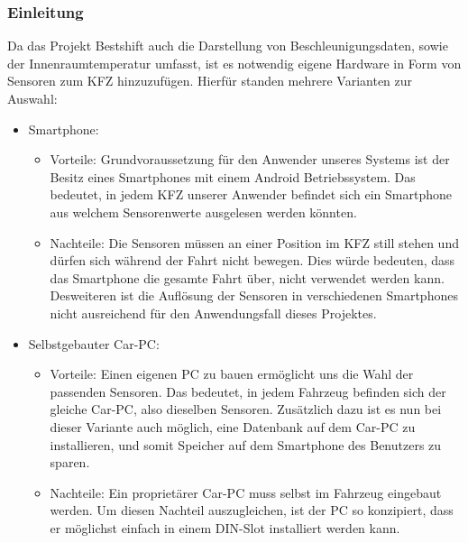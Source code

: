 \subsubsection{Einleitung}
\label{subsec:Einleitung}

Da das Projekt Bestshift auch die Darstellung von Beschleunigungsdaten, sowie der Innenraumtemperatur umfasst, ist es notwendig eigene Hardware in Form von Sensoren zum KFZ hinzuzufügen.
Hierfür standen mehrere Varianten zur Auswahl:

\begin{itemize}
	\item Smartphone:
	\begin{itemize}
	\item Vorteile: \nextline
	Grundvoraussetzung für den Anwender unseres Systems ist der Besitz eines Smartphones mit einem Android Betriebssystem.
	Das bedeutet, in jedem KFZ unserer Anwender befindet sich ein Smartphone aus welchem Sensorenwerte ausgelesen werden könnten.
	\item Nachteile: \nextline
	Die Sensoren müssen an einer Position im KFZ still stehen und dürfen sich während der Fahrt nicht bewegen. Dies würde bedeuten, dass das Smartphone die gesamte Fahrt über, nicht verwendet werden kann.
\nextline
Desweiteren ist die Auflösung der Sensoren in verschiedenen Smartphones nicht ausreichend für den Anwendungsfall dieses Projektes.
	\end{itemize}
	\item Selbstgebauter Car-PC:
	\begin{itemize}
	\item Vorteile: \nextline
	Einen eigenen PC zu bauen ermöglicht uns die Wahl der passenden Sensoren. Das bedeutet, in jedem Fahrzeug befinden sich der gleiche Car-PC, also dieselben Sensoren.
	Zusätzlich dazu ist es nun bei dieser Variante auch möglich, eine Datenbank auf dem Car-PC zu installieren, und somit Speicher auf dem Smartphone des Benutzers zu sparen.
	\item Nachteile: \nextline
	Ein proprietärer Car-PC muss selbst im Fahrzeug eingebaut werden. Um diesen Nachteil auszugleichen, ist der PC so konzipiert, dass er möglichst einfach in einem DIN-Slot installiert werden kann.
	\end{itemize}
\end{itemize}